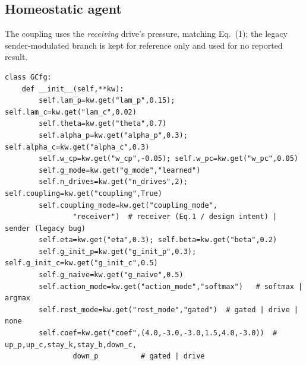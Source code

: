 \documentclass{article}
\begin{document}
\subsection{Homeostatic agent}
The coupling uses the \emph{receiving} drive's pressure, matching Eq.~(1); the legacy sender-modulated branch is kept for reference only and used for no reported result.
\begin{verbatim}
class GCfg:
    def __init__(self,**kw):
        self.lam_p=kw.get("lam_p",0.15); self.lam_c=kw.get("lam_c",0.02)
        self.theta=kw.get("theta",0.7)
        self.alpha_p=kw.get("alpha_p",0.3); self.alpha_c=kw.get("alpha_c",0.3)
        self.w_cp=kw.get("w_cp",-0.05); self.w_pc=kw.get("w_pc",0.05)
        self.g_mode=kw.get("g_mode","learned")
        self.n_drives=kw.get("n_drives",2); self.coupling=kw.get("coupling",True)
        self.coupling_mode=kw.get("coupling_mode",
                "receiver")  # receiver (Eq.1 / design intent) | sender (legacy bug)
        self.eta=kw.get("eta",0.3); self.beta=kw.get("beta",0.2)
        self.g_init_p=kw.get("g_init_p",0.3); self.g_init_c=kw.get("g_init_c",0.5)
        self.g_naive=kw.get("g_naive",0.5)
        self.action_mode=kw.get("action_mode","softmax")   # softmax | argmax
        self.rest_mode=kw.get("rest_mode","gated")  # gated | drive | none
        self.coef=kw.get("coef",(4.0,-3.0,-3.0,1.5,4.0,-3.0))  # up_p,up_c,stay_k,stay_b,down_c,
                down_p          # gated | drive


\end{verbatim}
\end{document}

